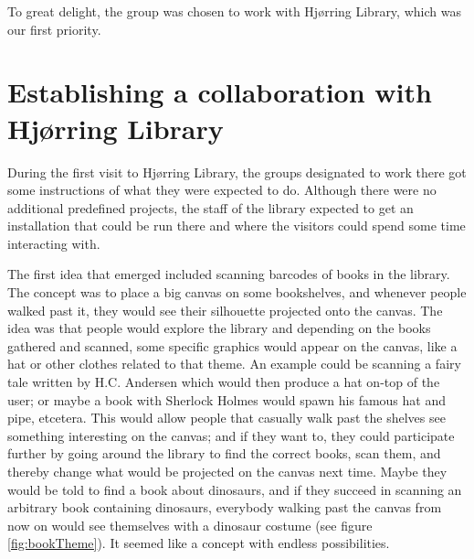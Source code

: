 To great delight, the group was chosen to work with Hj{\o}rring Library, which was our first priority.

\section{Establishing a collaboration with Hj{\o}rring Library}


During the first visit to Hj{\o}rring Library, the groups designated to work there got some instructions of what they were expected to do. Although there were no additional predefined projects, the staff of the library expected to get an installation that could be run there and where the visitors could spend some time interacting with.

The first idea that emerged included scanning barcodes of books in the library. The concept was to place a big canvas on some bookshelves, and whenever people walked past it, they would see their silhouette projected onto the canvas. The idea was that people would explore the library and depending on the books gathered and scanned, some specific graphics would appear on the canvas, like a hat or other clothes related to that theme. An example could be scanning a fairy tale written by H.C. Andersen which would then produce a hat on-top of the user; or maybe a book with Sherlock Holmes would spawn his famous hat and pipe, etcetera. This would allow people that casually walk past the shelves see something interesting on the canvas; and if they want to, they could participate further by going around the library to find the correct books, scan them, and thereby change what would be projected on the canvas next time. Maybe they would be told to find a book about dinosaurs, and if they succeed in scanning an arbitrary book containing dinosaurs, everybody walking past the canvas from now on would see themselves with a dinosaur costume (see figure \ref{fig:bookTheme}). It seemed like a concept with endless possibilities.

